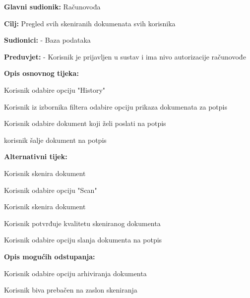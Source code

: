 					\noindent {}
						\begin{packed_item}
		
							\item \textbf{Glavni sudionik:} Računovođa
							\item  \textbf{Cilj:} Pregled svih skeniranih dokumenata svih korisnika
							\item  \textbf{Sudionici:} - Baza podataka
							\item  \textbf{Preduvjet:} - Korisnik je prijavljen u sustav i ima nivo autorizacije računovođe
							\item  \textbf{Opis osnovnog tijeka:}
							
							\item[] \begin{packed_enum}
								\item Korisnik odabire opciju "History"
								\item Korisnik iz izbornika filtera odabire opciju prikaza dokumenata za potpis
								\item Korisnik odabire dokument koji želi poslati na potpis
								\item korisnik šalje dokument na potpis
							\end{packed_enum}

							\item  \textbf{Alternativni tijek:}

							\item[] \begin{packed_item}
		
								\item[1-3.a]Korisnik skenira dokument
								\item[] \begin{packed_enum}
									\item Korisnik odabire opciju "Scan"
									\item Korisnik skenira dokument
									\item Korisnik potvrđuje kvalitetu skeniranog dokumenta
									\item Korisnik odabire opciju slanja dokumenta na potpis
								\end{packed_enum}
								\item  \textbf{Opis mogućih odstupanja:}
							
								\item[] \begin{packed_item}
			
									\item[4.]Korisnik odabire opciju arhiviranja dokumenta
									\item[] \begin{packed_enum}
										\item Korisnik biva prebačen na zaslon skeniranja
									\end{packed_enum}
								\end{packed_item}
							\end{packed_item}
						\end{packed_item}

